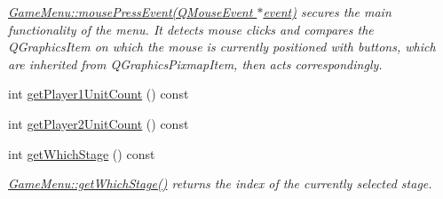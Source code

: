 \begin{DoxyCompactItemize}
\begin{DoxyCompactList}\small\item\em \hyperlink{class_game_menu_ab043085d1280afd8f33c5e962a171373}{Game\+Menu\+::mouse\+Press\+Event(\+Q\+Mouse\+Event $\ast$event)} secures the main functionality of the menu. It detects mouse clicks and compares the Q\+Graphics\+Item on which the mouse is currently positioned with buttons, which are inherited from Q\+Graphics\+Pixmap\+Item, then acts correspondingly. \end{DoxyCompactList}\item 
int \hyperlink{class_game_menu_ac37e4932a0aa396be6ffb04cad2061b2}{get\+Player1\+Unit\+Count} () const 
\item 
int \hyperlink{class_game_menu_a9fd03816511faec236d787298237b231}{get\+Player2\+Unit\+Count} () const 
\item 
int \hyperlink{class_game_menu_a45729234e7d5e250608217f0b24ac8da}{get\+Which\+Stage} () const 
\begin{DoxyCompactList}\small\item\em \hyperlink{class_game_menu_a45729234e7d5e250608217f0b24ac8da}{Game\+Menu\+::get\+Which\+Stage()} returns the index of the currently selected stage. \end{DoxyCompactList}\end{DoxyCompactItemize}
